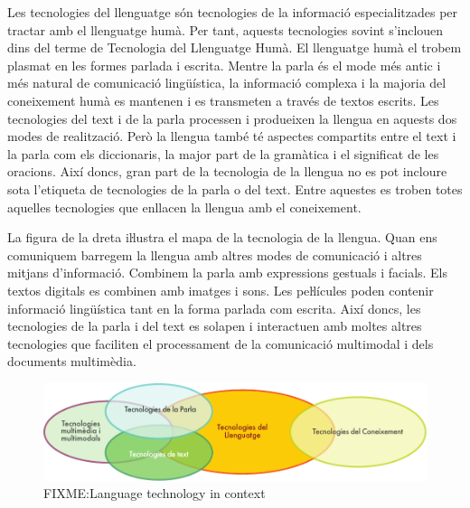 \documentclass[]{../../metanetpaper}
\begin{document}
\clearpage



\begin{multicols}{2}

Les tecnologies del llenguatge són tecnologies de la informació especialitzades per tractar amb el llenguatge humà. Per tant, aquests tecnologies sovint s’inclouen dins del terme de Tecnologia del Llenguatge Humà. El llenguatge humà el trobem plasmat en les formes parlada i escrita. Mentre la parla és el mode més antic i més natural de comunicació lingüística, la informació complexa i la majoria del coneixement humà es mantenen i es transmeten a través de textos escrits. Les tecnologies del text i de la parla processen i produeixen la llengua en aquests dos modes de realització. Però la llengua també té aspectes compartits entre el text i la parla com els diccionaris, la major part de la gramàtica i el significat de les oracions. Així doncs, gran part de la tecnologia de la llengua no es pot incloure sota l’etiqueta de tecnologies de la parla o del text. Entre aquestes es troben totes aquelles tecnologies que enllacen la llengua amb el coneixement.

 La figura de la dreta iŀlustra el mapa de la tecnologia de la llengua. Quan ens comuniquem barregem la llengua amb altres modes de comunicació i altres mitjans d’informació. Combinem la parla amb expressions gestuals i facials. Els textos digitals es combinen amb imatges i sons. Les peŀlícules poden contenir informació lingüística tant en la forma parlada com escrita. Així doncs, les tecnologies de la parla i del text es solapen i interactuen amb moltes altres tecnologies que faciliten el processament de la comunicació multimodal i dels documents multimèdia.

\begin{figure}[htb]
  \vspace{-25mm}
  \center
  \includegraphics[width=\textwidth]{../_media/catalan/language_technologies}
  \caption{FIXME:Language technology in context}
  \label{fig:ltincontext_ca}
\end{figure}



\end{multicols}
\end{document}
